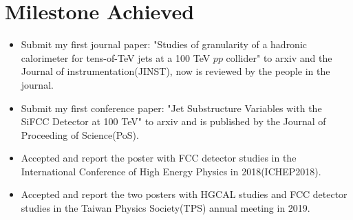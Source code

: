 \section{Milestone Achieved}
\begin{itemize}
\item Submit my first journal paper: "Studies of granularity of a hadronic calorimeter for tens-of-TeV jets at a 100 TeV $pp$ collider" to arxiv and the Journal of instrumentation(JINST), now is reviewed by the people in the journal.
\item Submit my first conference paper: "Jet Substructure Variables with the SiFCC Detector at 100 TeV" to arxiv and is published by the Journal of Proceeding of Science(PoS).
\item Accepted and report the poster with FCC detector studies in the International Conference of High Energy Physics in 2018(ICHEP2018).
\item Accepted and report the two posters with HGCAL studies and FCC detector studies in the Taiwan Physics Society(TPS) annual meeting in 2019. 
\end{itemize}




